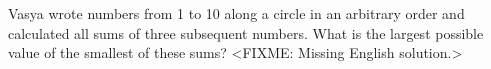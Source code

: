 \problem
Vasya wrote numbers from 1 to 10 along a circle in an arbitrary order and
calculated all sums of three subsequent numbers.
What is the largest possible value of the smallest of these sums?
\solution
<FIXME: Missing English solution.>
\endproblem
